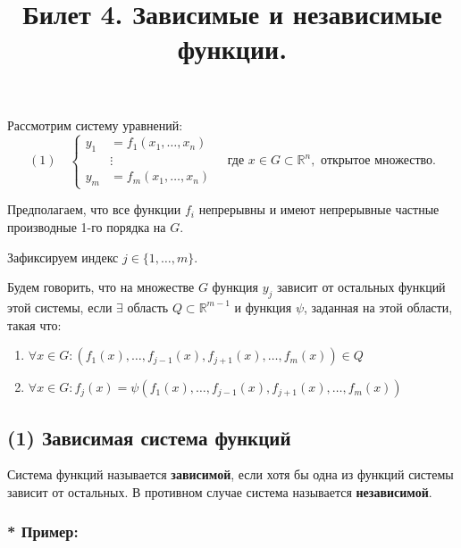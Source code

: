 \documentclass{article}
\title{ Билет 4. Зависимые и независимые функции.}
\author{}
\date{}
\begin{document}
\maketitle

Рассмотрим систему уравнений:
\begin{equation}
(1) \quad
\left\{
\begin{aligned}
y_1 &= f_1(x_1, \dots, x_n) \\
&\vdots \\
y_m &= f_m(x_1, \dots, x_n)
\end{aligned}
\right.
\quad
\text{где } x \in G \subset \mathbb{R}^n, \text{ открытое множество}.
\end{equation}

Предполагаем, что все функции $f_i$ непрерывны и имеют непрерывные частные производные 1-го порядка на $G$.

Зафиксируем индекс $j \in \{1, \dots, m\}$.

Будем говорить, что на множестве $G$ функция $y_j$ зависит от остальных функций этой системы, если $\exists$ область $Q \subset \mathbb{R}^{m-1}$ и функция $\psi$, заданная на этой области, такая что:
\begin{enumerate}
    \item $\forall x \in G: \left(f_1(x), \dots, f_{j-1}(x), f_{j+1}(x), \dots, f_m(x)\right) \in Q$
    \item $\forall x \in G: f_j(x) = \psi\left(f_1(x), \dots, f_{j-1}(x), f_{j+1}(x), \dots, f_m(x)\right)$
\end{enumerate}

\subsection*{(1) Зависимая система функций}

Система функций называется \textbf{зависимой}, если хотя бы одна из функций системы зависит от остальных. В противном случае система называется \textbf{независимой}.

\subsubsection*{* Пример:}
\end{document}
